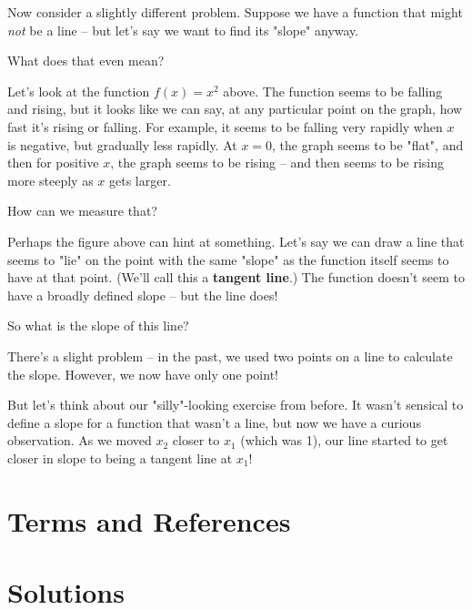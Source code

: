 Now consider a slightly different problem. Suppose we have a function that might \textit{not} be a line -- but let's say we want to find its "slope" anyway.

\vspace{2in}

What does that even mean? 

Let's look at the function $f(x) = x^2$ above. The function seems to be falling and rising, but it looks like we can say, at any particular point on the graph, how fast it's rising or falling. For example, it seems to be falling very rapidly when $x$ is negative, but gradually less rapidly. At $x = 0$, the graph seems to be "flat", and then for positive $x$, the graph seems to be rising -- and then seems to be rising more steeply as $x$ gets larger.

How can we measure that?

\vspace{2in}

Perhaps the figure above can hint at something. Let's say we can draw a line that seems to "lie" on the point with the same "slope" as the function itself seems to have at that point. (We'll call this a \textbf{tangent line}.) The function doesn't seem to have a broadly defined slope -- but the line does!

So what is the slope of this line?

There's a slight problem -- in the past, we used two points on a line to calculate the slope. However, we now have only one point!

\vspace{2in}

But let's think about our "silly"-looking exercise from before. It wasn't sensical to define a slope for a function that wasn't a line, but now we have a curious observation. As we moved $x_2$ closer to $x_1$ (which was 1), our line started to get closer in slope to being a tangent line at $x_1$!





\newpage
\section{Terms and References}

\section{Solutions}

